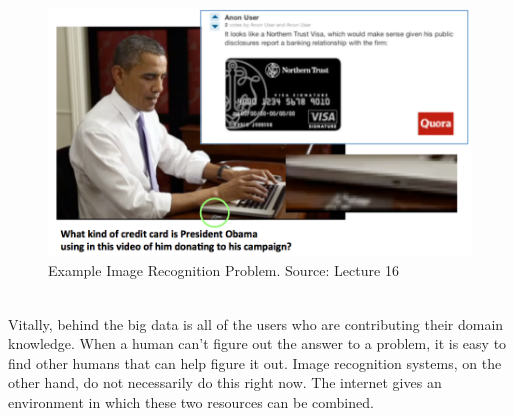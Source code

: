 \documentclass[11pt]{article}
\begin{document}
\begin{figure}[h]
  \centering
  \includegraphics[scale=0.6]{obamacreditcard.png}
  \caption{Example Image Recognition Problem. Source: Lecture 16}
\end{figure}\\
Vitally, behind the big data is all of the users who are contributing their domain knowledge. When a human can't figure out the answer to a problem, it is easy to find other humans that can help figure it out. Image recognition systems, on the other hand, do not necessarily do this right now. The internet gives an environment in which these two resources can be combined.
\end{document}
